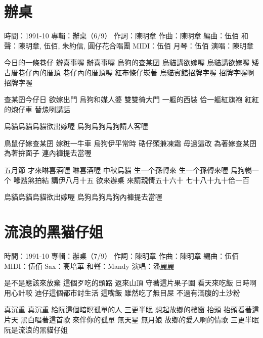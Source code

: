 \documentclass[UTF8,a4paper,oneside,twocolumn,12pt]{ctexbook}
\newcommand{\infopair}[2]{\textbullet #1：#2}
\newcommand{\zc}[1][伍佰]{\infopair{作詞}{#1}}
\newcommand{\zq}[1][伍佰]{\infopair{作曲}{#1}}
\newcommand{\bq}[1][伍佰]{\infopair{編曲}{#1}}
\newcommand{\zj}[1]{\infopair{專輯}{#1}}
\newcommand{\sj}[1]{\infopair{時間}{#1}}
\newenvironment{info}{\begin{flushleft}\kaishu
	}
	{\end{flushleft}\normalsize\yahei\par}
\newenvironment{lyric}{
	}
{}
\begin{document}
\section{辦桌}
\begin{info}
	\sj{1991-10}
	\zj{辦桌（6/9）}
	\zc[陳明章]
	\zq[陳明章]
	\bq[伍佰]
	\infopair{和聲}{陳明章, 伍佰, 朱約信, 圓仔花合唱團}
	\infopair{MIDI}{伍佰}
	\infopair{月琴}{伍佰}
	\infopair{演唱}{陳明章}
\end{info}
\begin{lyric}
	今日的一條巷仔 辦喜事喔 辦喜事喔
	烏狗的查某囝 烏貓講欲嫁喔 烏貓講欲嫁喔
	矮古厝巷仔內的厝頂 巷仔內的厝頂喔
	紅布條仔崁著 烏貓賓館招牌字喔 招牌字喔啊招牌字喔

	查某囝今仔日 欲嫁出門
	烏狗和媒人婆 雙雙徛大門
	一軀的西裝 佮一軀紅旗袍
	紅紅的炮仔車 替怹咧講話

	烏貓烏貓烏貓欲出嫁喔
	烏狗烏狗烏狗請人客喔

	鳥鼠仔嫁查某囝 嫁粧一牛車
	烏狗伊平常時 硞仔頭兼凍霜
	毋過這改 為著嫁查某囝
	為著拚面子 連內褲提去當喔

	五月節 才來啉喜酒喔 啉喜酒喔
	中秋烏貓 生一个孫轉來
	生一个孫轉來喔
	烏狗暢一个 喙鬚煞拍結
	講伊八月十五 欲來辦桌
	來請親情五十六十 七十八十九十佮一百

	烏貓烏貓烏貓欲出嫁喔
	烏狗烏狗烏狗內褲提去當喔
\end{lyric}

\section{流浪的黑猫仔姐}
\begin{info}
	\sj{1991-10}
	\zj{辦桌（7/9）}
	\zc[陳明章]
	\zq[陳明章]
	\bq[伍佰]
	\infopair{MIDI}{伍佰}
	\infopair{Sax}{高培華}
	\infopair{和聲}{Mandy}
	\infopair{演唱}{潘麗麗}
\end{info}
\begin{lyric}
	是不是應該來放棄 這個歹吃的頭路
	返來山頂
	守著這片果子園 看天來吃飯
	日時啊用心計較
	迪仔這個都市討生活
	這嘴飯
	雖然吃了無目屎 不過有滿腹的土沙粉

	真沉重 真沉重
	給阮這個暗瞑孤單的人
	三更半眠 想起故鄉的樓窗
	抬頭 抬頭看著這片天
	黑白唱著這首歌 來伴你的孤單
	無天星 無月娘 故鄉的愛人啊的情歌
	三更半眠 阮是流浪的黑貓仔姐
\end{lyric}
\end{document}
